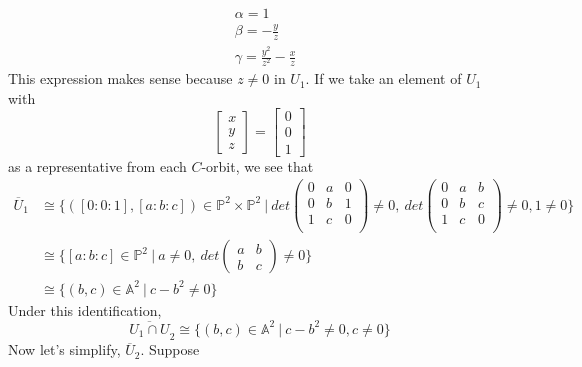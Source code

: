 \begin{example}
	\begin{align*}
		&\alpha=1\\
		&\beta=-\frac{y}{z}\\
		&\gamma=\frac{y^2}{z^2}-\frac{x}{z}
	\end{align*}
This expression makes sense because $z\neq 0$ in $U_1$.
If we take an element of $U_1$ with 
\[
	\begin{bmatrix}
		x\\
		y\\
		z
	\end{bmatrix}
	=
	\begin{bmatrix}
		0\\
		0\\
		1
	\end{bmatrix}	
\]
as a representative from each $C$-orbit, we see that 
\begin{align*}
	\overline{U}_1
	&\cong
	\{
	([0:0:1],[a:b:c])\in \mathbb{P}^2 \times \mathbb{P}^2~|~
	det	
	\begin{pmatrix}
	0&a&0\\
	0&b&1\\
	1&c&0\\
	\end{pmatrix}
	\neq 0,~
	det	
	\begin{pmatrix}
	0&a&b\\
	0&b&c\\
	1&c&0\\
	\end{pmatrix}
	\neq 0,
	1\neq 0	 	
	\}\\
	&\cong
	\{
	[a:b:c]\in \mathbb{P}^2~|~
	a\neq 0,~
	det	
	\begin{pmatrix}
	a&b\\
	b&c
	\end{pmatrix}
	\neq 0	 	
	\}\\
	&\cong
	\{
	(b,c)\in \mathbb{A}^2~|~
	c-b^2\neq 0 	
	\}	
\end{align*}
Under this identification,
\[
	\overline{U_1\cap U}_2
	\cong
	\{
	(b,c)\in \mathbb{A}^2~|~
	c-b^2\neq 0,c\neq 0 	
	\}
\]
Now let's simplify, $ \overline{U}_2 $. Suppose


\end{example}
